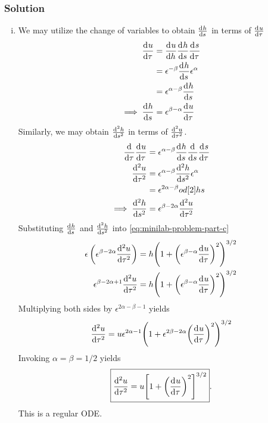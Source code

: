 \documentclass[12pt,twoside]{article}
\begin{document}
\subsubsection*{Solution}
\begin{enumerate}[(i)]
\item We may utilize the change of variables to obtain $\od{h}{s}$ in terms of
  $\od{u}{\tau}$
  \begin{equation*}
    \begin{aligned}
      \od{u}{\tau} &= \od{u}{h}\od{h}{s}\od{s}{\tau} \\
      &= \epsilon^{-\beta}\od{h}{s}\epsilon^{\alpha} \\
      &= \epsilon^{\alpha-\beta}\od{h}{s} \\
      \implies \od{h}{s} &= \epsilon^{\beta-\alpha}\od{u}{\tau} \\
    \end{aligned}
  \end{equation*}
  Similarly, we may obtain $\od[2]{h}{s}$ in terms of $\od[2]{u}{\tau}$.
  \begin{equation*}
    \begin{aligned}
      \od{}{\tau}\od{u}{\tau} &= \epsilon^{\alpha-\beta}\od{h}{s}\od{}{s}\od{s}{\tau} \\
      \od[2]{u}{\tau} &= \epsilon^{\alpha-\beta}\od[2]{h}{s}\epsilon^{\alpha} \\
      &= \epsilon^{2\alpha-\beta}od[2]{h}{s} \\
      \implies \od[2]{h}{s} &= \epsilon^{\beta-2\alpha}\od[2]{u}{\tau}
    \end{aligned}
  \end{equation*}
  Substituting $\od{h}{s}$ and $\od[2]{h}{s}$ into \cref{eq:minilab-problem-part-c}
  \begin{equation*}
    \begin{aligned}
      \epsilon\left(\epsilon^{\beta-2\alpha}\od[2]{u}{\tau}\right) &=
      h{\left(1+{\left(\epsilon^{\beta-\alpha}\od{u}{\tau}\right)}^2\right)}^{3/2} \\
      \epsilon^{\beta-2\alpha+1}\od[2]{u}{\tau} &=
    h{\left(1+{\left(\epsilon^{\beta-\alpha}\od{u}{\tau}\right)}^2\right)}^{3/2}
    \end{aligned}
  \end{equation*}
  Multiplying both sides by $\epsilon^{2\alpha-\beta-1}$ yields
  \begin{equation*}
    \od[2]{u}{\tau} = u \epsilon ^{2 \alpha -1} {\left(1+\epsilon ^{2 \beta -2 \alpha }
        {\left(\od{u}{\tau}\right)}^2\right)}^{3/2}
  \end{equation*}
  Invoking $\alpha=\beta=1/2$ yields
  \begin{equation*}
    \boxed{\od[2]{u}{\tau} = u {\left[ 1+{\left(\od{u}{\tau}\right)}^2\right]}^{3/2}}.
  \end{equation*}
  This is a regular ODE.\@


\end{enumerate}
\end{document}
